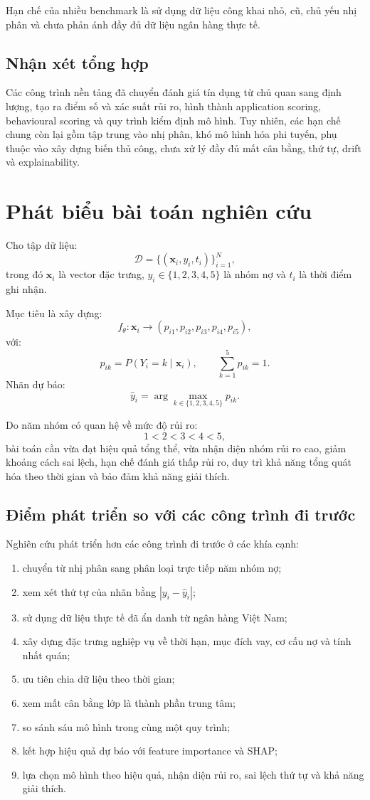 Hạn chế của nhiều benchmark là sử dụng dữ liệu công khai nhỏ, cũ, chủ yếu nhị phân và chưa phản ánh đầy đủ dữ liệu ngân hàng thực tế.

\subsection{Nhận xét tổng hợp}

Các công trình nền tảng đã chuyển đánh giá tín dụng từ chủ quan sang định lượng, tạo ra điểm số và xác suất rủi ro, hình thành application scoring, behavioural scoring và quy trình kiểm định mô hình. Tuy nhiên, các hạn chế chung còn lại gồm tập trung vào nhị phân, khó mô hình hóa phi tuyến, phụ thuộc vào xây dựng biến thủ công, chưa xử lý đầy đủ mất cân bằng, thứ tự, drift và explainability.

\section{Phát biểu bài toán nghiên cứu}

Cho tập dữ liệu:
\[
\mathcal{D}=\{(\mathbf{x}_i,y_i,t_i)\}_{i=1}^{N},
\]
trong đó $\mathbf{x}_i$ là vector đặc trưng, $y_i\in\{1,2,3,4,5\}$ là nhóm nợ và $t_i$ là thời điểm ghi nhận.

Mục tiêu là xây dựng:
\[
f_{\theta}:\mathbf{x}_i\longrightarrow(p_{i1},p_{i2},p_{i3},p_{i4},p_{i5}),
\]
với:
\[
p_{ik}=P(Y_i=k\mid\mathbf{x}_i),\qquad \sum_{k=1}^{5}p_{ik}=1.
\]
Nhãn dự báo:
\[
\hat{y}_i=\arg\max_{k\in\{1,2,3,4,5\}}p_{ik}.
\]

Do năm nhóm có quan hệ về mức độ rủi ro:
\[
1<2<3<4<5,
\]
bài toán cần vừa đạt hiệu quả tổng thể, vừa nhận diện nhóm rủi ro cao, giảm khoảng cách sai lệch, hạn chế đánh giá thấp rủi ro, duy trì khả năng tổng quát hóa theo thời gian và bảo đảm khả năng giải thích.

\subsection{Điểm phát triển so với các công trình đi trước}

Nghiên cứu phát triển hơn các công trình đi trước ở các khía cạnh:
\begin{enumerate}
    \item chuyển từ nhị phân sang phân loại trực tiếp năm nhóm nợ;
    \item xem xét thứ tự của nhãn bằng $|y_i-\hat{y}_i|$;
    \item sử dụng dữ liệu thực tế đã ẩn danh từ ngân hàng Việt Nam;
    \item xây dựng đặc trưng nghiệp vụ về thời hạn, mục đích vay, cơ cấu nợ và tính nhất quán;
    \item ưu tiên chia dữ liệu theo thời gian;
    \item xem mất cân bằng lớp là thành phần trung tâm;
    \item so sánh sáu mô hình trong cùng một quy trình;
    \item kết hợp hiệu quả dự báo với feature importance và SHAP;
    \item lựa chọn mô hình theo hiệu quả, nhận diện rủi ro, sai lệch thứ tự và khả năng giải thích.
\end{enumerate}

